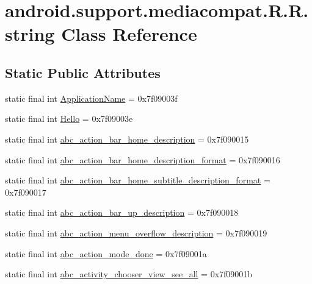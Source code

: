 \hypertarget{classandroid_1_1support_1_1mediacompat_1_1_r_1_1string}{
\section{android.support.mediacompat.R.R.string Class Reference}
\label{classandroid_1_1support_1_1mediacompat_1_1_r_1_1string}
}
\subsection*{Static Public Attributes}
\begin{CompactItemize}
\item 
static final int \hyperlink{classandroid_1_1support_1_1mediacompat_1_1_r_1_1string_dadc207d0aa37bd488d2779460b64b28}{ApplicationName} = 0x7f09003f
\item 
static final int \hyperlink{classandroid_1_1support_1_1mediacompat_1_1_r_1_1string_14ee04e4e4133f4d8b684c725c1bc68b}{Hello} = 0x7f09003e
\item 
static final int \hyperlink{classandroid_1_1support_1_1mediacompat_1_1_r_1_1string_45227507492b75c08ad899b30bbfa873}{abc\_\-action\_\-bar\_\-home\_\-description} = 0x7f090015
\item 
static final int \hyperlink{classandroid_1_1support_1_1mediacompat_1_1_r_1_1string_f1606c418c166c76e2747450c9401dc5}{abc\_\-action\_\-bar\_\-home\_\-description\_\-format} = 0x7f090016
\item 
static final int \hyperlink{classandroid_1_1support_1_1mediacompat_1_1_r_1_1string_b6c01db45481be684825b16694c784f4}{abc\_\-action\_\-bar\_\-home\_\-subtitle\_\-description\_\-format} = 0x7f090017
\item 
static final int \hyperlink{classandroid_1_1support_1_1mediacompat_1_1_r_1_1string_ace159c0dba838359c86cee4b868105a}{abc\_\-action\_\-bar\_\-up\_\-description} = 0x7f090018
\item 
static final int \hyperlink{classandroid_1_1support_1_1mediacompat_1_1_r_1_1string_75deebcac0c59063510403614b8a42cf}{abc\_\-action\_\-menu\_\-overflow\_\-description} = 0x7f090019
\item 
static final int \hyperlink{classandroid_1_1support_1_1mediacompat_1_1_r_1_1string_add5994a18bf2673d6dd1666918f01ee}{abc\_\-action\_\-mode\_\-done} = 0x7f09001a
\item 
static final int \hyperlink{classandroid_1_1support_1_1mediacompat_1_1_r_1_1string_5296a78b4a92fd96da50190adfb27e87}{abc\_\-activity\_\-chooser\_\-view\_\-see\_\-all} = 0x7f09001b

\end{CompactItemize}

